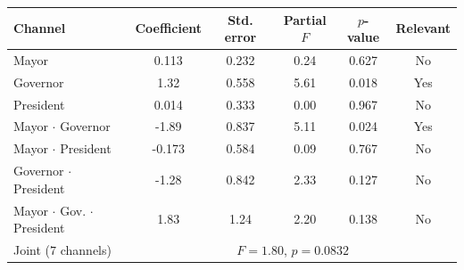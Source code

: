 \begin{tabular}{@{}lccccc@{}}
\toprule
Channel & Coefficient & Std. error & Partial $F$ & $p$-value & Relevant \\
\midrule
Mayor & 0.113 & 0.232 & 0.24 & 0.627 & No \\
Governor & 1.32 & 0.558 & 5.61 & 0.018 & Yes \\
President & 0.014 & 0.333 & 0.00 & 0.967 & No \\
Mayor $\cdot$ Governor & -1.89 & 0.837 & 5.11 & 0.024 & Yes \\
Mayor $\cdot$ President & -0.173 & 0.584 & 0.09 & 0.767 & No \\
Governor $\cdot$ President & -1.28 & 0.842 & 2.33 & 0.127 & No \\
Mayor $\cdot$ Gov. $\cdot$ President & 1.83 & 1.24 & 2.20 & 0.138 & No \\
\midrule
Joint ($7$ channels) & \multicolumn{5}{c}{$F=1.80$, $p=0.0832$} \\
\bottomrule
\end{tabular}
